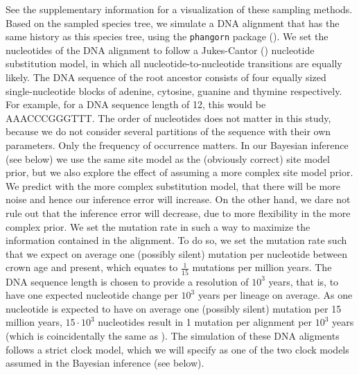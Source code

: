\documentclass{article}
\begin{document}
See the supplementary information for a visualization of these sampling methods.
Based on the sampled species tree, we simulate a DNA alignment that has the same history
as this species tree, using the \verb;phangorn; package (\cite{phangorn}). 
We set the nucleotides of the DNA alignment to follow a Jukes-Cantor (\cite{jc69})
nucleotide substitution model, in which all nucleotide-to-nucleotide transitions
are equally likely. 
The DNA sequence of the root ancestor consists of four equally sized single-nucleotide blocks of adenine, cytosine, guanine and thymine respectively. 
For example, for a DNA sequence length of 12, this would be AAACCCGGGTTT. 
The order of nucleotides does not matter in this study, 
because we do not consider several partitions of the sequence with their own parameters. 
Only the frequency of occurrence matters.
In our Bayesian inference (see below) we use the same site model as the (obviously correct) site model prior,
but we also explore the effect of assuming a more complex site model prior.
We predict with the more complex substitution model, 
that there will be more noise and hence our inference error will increase.
On the other hand, we dare not rule out that the inference error will decrease,
due to more flexibility in the more complex prior.
We set the mutation rate in such a way to maximize the information contained in the alignment.
To do so, we set the mutation rate such that we expect on average one (possibly silent) mutation per nucleotide
between crown age and present, which equates to $\frac{1}{15}$ mutations
per million years.
The DNA sequence length is chosen to provide a
resolution of $10^3$ years, 
that is, to have one expected nucleotide change 
per $10^3$ years per lineage on average. As one nucleotide is expected 
to have on average one (possibly silent) mutation per 15 million years, $15 \cdot 10^3$
nucleotides result in 1 mutation per alignment per $10^3$ years (which is
coincidentally the same as \cite{moller2018}). 
The simulation of these DNA aligments follows a strict clock model, 
which we will specify as one of the two clock models assumed in the Bayesian inference (see below).
\end{document}
